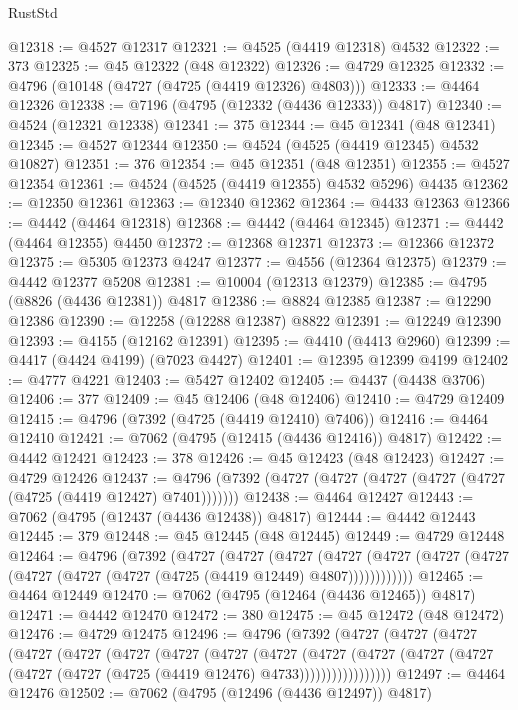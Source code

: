 \begin{lexlean}{RustStd}
\begin{coremodule}
@12318 := @4527 @12317
@12321 := @4525 (@4419 @12318) @4532
@12322 := 373
@12325 := @45 @12322 (@48 @12322)
@12326 := @4729 @12325
@12332 := @4796 (@10148 (@4727 (@4725 (@4419 @12326) @4803)))
@12333 := @4464 @12326
@12338 := @7196 (@4795 (@12332 (@4436 @12333)) @4817)
@12340 := @4524 (@12321 @12338)
@12341 := 375
@12344 := @45 @12341 (@48 @12341)
@12345 := @4527 @12344
@12350 := @4524 (@4525 (@4419 @12345) @4532 @10827)
@12351 := 376
@12354 := @45 @12351 (@48 @12351)
@12355 := @4527 @12354
@12361 := @4524 (@4525 (@4419 @12355) @4532 @5296) @4435
@12362 := @12350 @12361
@12363 := @12340 @12362
@12364 := @4433 @12363
@12366 := @4442 (@4464 @12318)
@12368 := @4442 (@4464 @12345)
@12371 := @4442 (@4464 @12355) @4450
@12372 := @12368 @12371
@12373 := @12366 @12372
@12375 := @5305 @12373 @4247
@12377 := @4556 (@12364 @12375)
@12379 := @4442 @12377 @5208
@12381 := @10004 (@12313 @12379)
@12385 := @4795 (@8826 (@4436 @12381)) @4817
@12386 := @8824 @12385
@12387 := @12290 @12386
@12390 := @12258 (@12288 @12387) @8822
@12391 := @12249 @12390
@12393 := @4155 (@12162 @12391)
@12395 := @4410 (@4413 @2960)
@12399 := @4417 (@4424 @4199) (@7023 @4427)
@12401 := @12395 @12399 @4199
@12402 := @4777 @4221
@12403 := @5427 @12402
@12405 := @4437 (@4438 @3706)
@12406 := 377
@12409 := @45 @12406 (@48 @12406)
@12410 := @4729 @12409
@12415 := @4796 (@7392 (@4725 (@4419 @12410) @7406))
@12416 := @4464 @12410
@12421 := @7062 (@4795 (@12415 (@4436 @12416)) @4817)
@12422 := @4442 @12421
@12423 := 378
@12426 := @45 @12423 (@48 @12423)
@12427 := @4729 @12426
@12437 := @4796 (@7392 (@4727 (@4727 (@4727 (@4727 (@4727 (@4725 (@4419 @12427) @7401)))))))
@12438 := @4464 @12427
@12443 := @7062 (@4795 (@12437 (@4436 @12438)) @4817)
@12444 := @4442 @12443
@12445 := 379
@12448 := @45 @12445 (@48 @12445)
@12449 := @4729 @12448
@12464 := @4796
    (@7392
      (@4727
        (@4727
          (@4727
            (@4727 (@4727 (@4727 (@4727 (@4727 (@4727 (@4727 (@4725 (@4419 @12449) @4807))))))))))))
@12465 := @4464 @12449
@12470 := @7062 (@4795 (@12464 (@4436 @12465)) @4817)
@12471 := @4442 @12470
@12472 := 380
@12475 := @45 @12472 (@48 @12472)
@12476 := @4729 @12475
@12496 := @4796
    (@7392
      (@4727
        (@4727
          (@4727
            (@4727
              (@4727
                (@4727
                  (@4727
                    (@4727
                      (@4727
                        (@4727
                          (@4727
                            (@4727 (@4727 (@4727 (@4727 (@4725 (@4419 @12476) @4733)))))))))))))))))
@12497 := @4464 @12476
@12502 := @7062 (@4795 (@12496 (@4436 @12497)) @4817)

\end{coremodule}
\end{lexlean}
